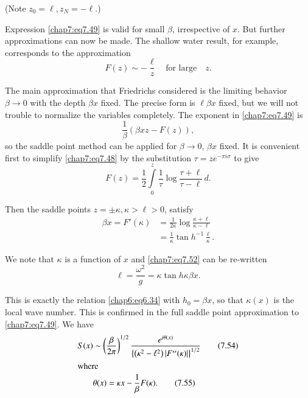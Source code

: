 {{(Note $z_0=\ell, z_N= -\ell$.)

Expression \eqref{chap7:eq7.49} is valid for small $\beta$, irrespective of $x$. But further approximations can now be made. The shallow water result, for example, corresponds to the approximation
$$
F(z)\sim -\frac{\ell}{z}\quad\text{for large}\quad z.
$$\pageoriginale

The main approximation that Friedrichs considered is the limiting behavior $\beta\to 0$ with the depth $\beta x$ fixed. The precise form is $\ell\beta x$ fixed, but we will not trouble to normalize the variables completely. The exponent in \eqref{chap7:eq7.49} is 
$$
\frac{1}{\beta}(\beta xz-F(z)),
$$
so the saddle point method can be applied for $\beta\to 0$, $\beta x$ fixed. It is convenient first to simplify \eqref{chap7:eq7.48} by the substitution $\tau =ze^{-\pi i\sigma}$ to give
\begin{equation}
F(z)=\frac{1}{2}\int\limits_0^z\frac{1}{\tau}\log \frac{\tau+\ell}{\tau-\ell} \,d.\tag{7.50}\label{chap7:eq7.50}
\end{equation}

Then the saddle points $z=\pm\kappa, \kappa >\ell >0$, satisfy
\begin{align}
\beta x=F'(\kappa) &=\frac{1}{2\kappa}\log \frac{\kappa+\ell}{\kappa-\ell} \tag{7.51}\label{chap7:eq7.51}\\
&= \frac{1}{\kappa}\tan h^{-1}\frac{\ell}{\kappa}. \tag{7.52}\label{chap7:eq7.52}
\end{align}

We note that $\kappa$ is a function of $x$ and \eqref{chap7:eq7.52} can be re-written
\begin{equation}
\ell =\frac{\omega^2}{g}=\kappa\tan h\kappa\beta x. \tag{7.53}\label{chap7:eq7.53}
\end{equation}

This is exactly the relation \eqref{chap6:eq6.34} with $h_0=\beta x$, so that $\kappa(x)$ is the local wave number. This is confirmed in the full saddle point approximation to \eqref{chap7:eq7.49}. We have 
\begin{align}
S(x)&\sim \left(\frac{\beta}{2\pi}\right)^{1/2} \frac{e^{i\theta(x)}} {\left\{ \left(\kappa^2-\ell^2\right)|F''(\kappa)|\right\}^{1/2}} \tag{7.54}\label{chap7:eq7.54}\\
\intertext{where}
& \theta(x)=\kappa x-\frac{1}{\beta}F(\kappa).\tag{7.55}\label{chap7:eq7.55}
\end{align}

}}
